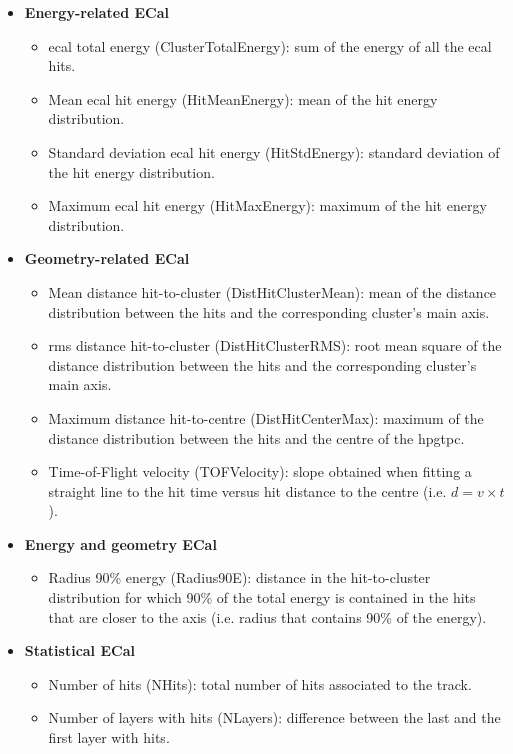 \begin{itemize}
	\item \textbf{Energy-related ECal}
	\begin{itemize}
		\item \gls{ecal} total energy (ClusterTotalEnergy): sum of the energy of all the \gls{ecal} hits.
		\item Mean \gls{ecal} hit energy (HitMeanEnergy): mean of the hit energy distribution.
		\item Standard deviation \gls{ecal} hit energy (HitStdEnergy): standard deviation of the hit energy distribution.
		\item Maximum \gls{ecal} hit energy (HitMaxEnergy): maximum of the hit energy distribution.
	\end{itemize}
	\item \textbf{Geometry-related ECal}
	\begin{itemize}
		\item Mean distance hit-to-cluster (DistHitClusterMean): mean of the distance distribution between the hits and the corresponding cluster's main axis.
		\item \gls{rms} distance hit-to-cluster (DistHitClusterRMS): root mean square of the distance distribution between the hits and the corresponding cluster's main axis.
		\item Maximum distance hit-to-centre (DistHitCenterMax): maximum of the distance distribution between the hits and the centre of the \gls{hpgtpc}.
		\item Time-of-Flight velocity (TOFVelocity): slope obtained when fitting a straight line to the hit time versus hit distance to the centre (i.e. $d = v \times t$).
	\end{itemize}
	\item \textbf{Energy and geometry ECal}
	\begin{itemize}
		\item Radius 90\% energy (Radius90E): distance in the hit-to-cluster distribution for which 90\% of the total energy is contained in the hits that are closer to the axis (i.e. radius that contains 90\% of the energy).
	\end{itemize}
	\item \textbf{Statistical ECal}
	\begin{itemize}
		\item Number of hits (NHits): total number of hits associated to the track.
		\item Number of layers with hits (NLayers): difference between the last and the first layer with hits.
	\end{itemize}
\end{itemize}

